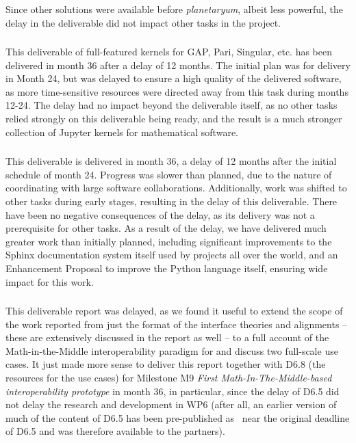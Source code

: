 Since other solutions were available before \emph{planetaryum}, albeit
less powerful, the delay in the deliverable did not impact other tasks
in the project.


\subsubsection{\protect{}}

This deliverable of full-featured kernels for GAP, Pari, Singular, etc.  has been
delivered in month 36 after a delay of 12 months.  The initial plan was for delivery in
Month 24, but was delayed to ensure a high quality of the delivered software, as more
time-sensitive resources were directed away from this task during months 12-24.  The delay
had no impact beyond the deliverable itself, as no other tasks relied strongly on this
deliverable being ready, and the result is a much stronger collection of Jupyter kernels
for mathematical software.

\subsubsection{\protect{}}

This deliverable is delivered in month 36, a delay of 12 months after the initial schedule
of month 24.  Progress was slower than planned, due to the nature of coordinating with
large software collaborations.  Additionally, work was shifted to other tasks during early
stages, resulting in the delay of this deliverable.  There have been no negative
consequences of the delay, as its delivery was not a prerequisite for other tasks.  As a
result of the delay, we have delivered much greater work than initially planned, including
significant improvements to the Sphinx documentation system itself used by projects all
over the world, and an Enhancement Proposal to improve the Python language itself,
ensuring wide impact for this work.


\subsubsection{\protect{}}
This deliverable report was delayed, as we found it useful to extend the scope of the work
reported from just the format of the interface theories and alignments -- these are
extensively discussed in the report as well -- to a full account of the Math-in-the-Middle
interoperability paradigm for \pn and discuss two full-scale use cases. It just made more
sense to deliver this report together with D6.8 (the resources for the use cases) for
Milestone M9 \emph{First Math-In-The-Middle-based interoperability prototype} in month 36,
in particular, since the delay of D6.5 did not delay the research and development in WP6
(after all, an earlier version of much of the content of D6.5 has been pre-published
as~\cite{WieKohRab:vtuimkb17,KohMuePfe:kbimss17} near the original deadline of D6.5 and
was therefore available to the \pn partners). 

